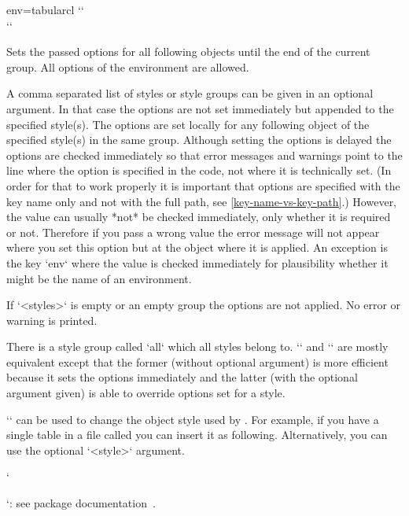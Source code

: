 \begin{tableobject}{env=tabular}{cl}
\DescribeMacro{\objectset}
`` \\
``

Sets the passed options for all following objects until the end of the current group.
All options of the  environment are allowed.

A comma separated list of styles or style groups can be given in an optional argument.
In that case the options are not set immediately but appended to the specified style(s).
The options are set locally for any following object of the specified style(s) in the same group.
Although setting the options is delayed the options are checked immediately so that error messages and warnings point to the line where the option is specified in the code, not where it is technically set.
(In order for that to work properly it is important that options are specified with the key name only and not with the full path, see \cref{key-name-vs-key-path}.)
However, the value can usually *not* be checked immediately, only whether it is required or not.
Therefore if you pass a wrong value the error message will not appear where you set this option but at the object where it is applied.
An exception is the key `env` where the value is checked immediately for plausibility whether it might be the name of an environment.

If `<styles>` is empty or an empty group the options are not applied.
No error or warning is printed.

There is a style group called `all` which all styles belong to.
`` and `` are mostly equivalent
except that the former (without optional argument) is more efficient because it sets the options immediately
and the latter (with the optional argument given) is able to override options set for a style.


\DescribeMacro{\graphicobjectstyle}
`` can be used to change the object style used by .
For example, if you have a single table in a file called  you can insert it as following.
Alternatively, you can use the optional `<style>` argument.

\begin{examplecode}
\begingroup
{}
\endgroup
\end{examplecode}


\DescribeMacro{\graphicspath}
`\graphicspath{{path/}}`: see  package documentation~\autocite[section~4.5]{graphicx}.



\end{tableobject}
